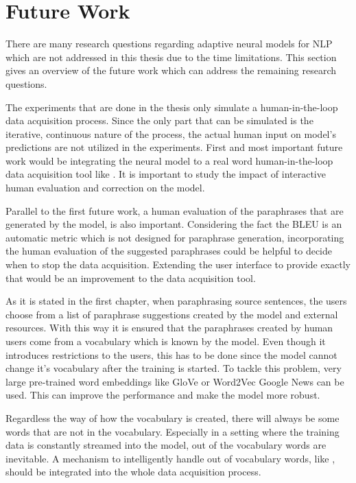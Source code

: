\chapter{Future Work}\label{conclusion}

There are many research questions regarding adaptive neural models for NLP which are not addressed in this thesis due to the time limitations. This section gives an overview of the future work which can address the remaining research questions. 

The experiments that are done in the thesis only simulate a human-in-the-loop data acquisition process. Since the only part that can be simulated is the iterative, continuous nature of the process, the actual human input on model's predictions are not utilized in the experiments. First and most important future work would be integrating the neural model to a real word human-in-the-loop data acquisition tool like \cite{par4sim}. It is important to study the impact of interactive human evaluation and correction on the model. 

Parallel to the first future work, a human evaluation of the paraphrases that are generated by the model, is also important. Considering the fact the BLEU is an automatic metric which is not designed for paraphrase generation, incorporating the human evaluation of the suggested paraphrases could be helpful to decide when to stop the data acquisition. Extending the user interface to provide exactly that would be an improvement to the data acquisition tool.

As it is stated in the first chapter, when paraphrasing source sentences, the users choose from a list of paraphrase suggestions created by the model and external resources. With this way it is ensured that the paraphrases created by human users come from a vocabulary which is known by the model. Even though it introduces restrictions to the users, this has to be done since the model cannot change it's vocabulary after the training is started. To tackle this problem, very large pre-trained word embeddings like GloVe \cite{glove} or Word2Vec Google News \cite{mikolov} can be used. This can improve the performance and make the model more robust.

Regardless the way of how the vocabulary is created, there will always be some words that are not in the vocabulary. Especially in a setting where the training data is constantly streamed into the model, out of the vocabulary words are inevitable. A mechanism to intelligently handle out of vocabulary words, like \cite{ofw} , should be integrated into the whole data acquisition process.

